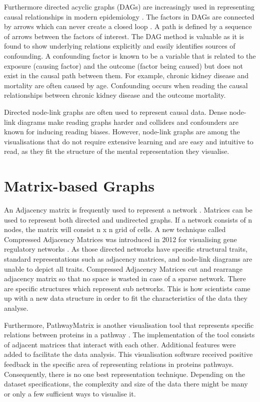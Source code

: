 \documentclass{l4proj}
\begin{document}
Furthermore directed acyclic graphs (DAGs) are increasingly used in representing causal relationships in modern epidemiology \cite{suttorp2015graphical}. The factors in DAGs are connected by arrows which can never create a closed loop \cite{greenland1999causal}. A path is defined by a sequence of arrows between the factors of interest. The DAG method is valuable as it is found to show underlying relations explicitly and easily identifies sources of confounding. A confounding factor is known to be a variable that is related to  the exposure (causing factor) and the outcome (factor being caused) but does not exist in the causal path between them. For example, chronic kidney disease and mortality are often caused by age. Confounding occurs when reading the causal relationships between chronic kidney disease and the outcome mortality. 

Directed node-link graphs are often used to represent causal data. Dense node-link diagrams make reading graphs harder and colliders and confounders are known for inducing reading biases. However, node-link graphs are among the visualisations that do not require extensive learning and are easy and intuitive to read, as they fit the structure of the mental representation they visualise\cite{netzel2014comparative}.

\section{Matrix-based Graphs}

An Adjacency matrix is frequently used to represent a network \cite{longabaugh2012combing}. Matrices can be used to represent both directed and undirected graphs. If a network consists of n nodes, the matrix will consist n x n grid of cells. A new technique called Compressed Adjacency Matrices was introduced in 2012 for visualising gene regulatory networks \cite{dinkla2012compressed}. As those directed networks have specific structural traits, standard representations such as adjacency matrices, and node-link diagrams are unable to depict all traits. Compressed Adjacency Matrices cut and rearrange adjacency matrix so that no space is wasted in case of a sparse network. There are specific structures which represent sub networks. This is how scientists came up with a new data structure in order to fit the characteristics of the data they analyse.

Furthermore, PathwayMatrix is another visualisation tool that represents specific relations between proteins in a pathway \cite{dang2015pathwaymatrix}. The implementation of the tool consists of adjacent matrices that interact with each other. Additional features were added to facilitate the data analysis. This visualisation software received positive feedback in the specific area of representing relations in proteins pathways. Consequently, there is no one best representation technique. Depending on the dataset specifications, the complexity and size of the data there might be many or only a few sufficient ways to visualise it.       
\end{document}
